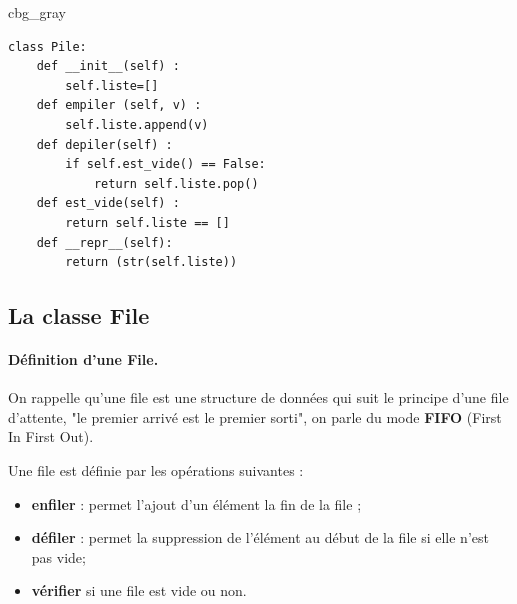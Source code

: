 \documentclass[%
oneside,                 %
final,                   %
10pt]{article}
\newenvironment{_cod_tight}[1]{
   \def\FrameCommand{\colorbox{#1}}
   \FrameRule0.6pt\MakeFramed {\FrameRestore}\vskip3mm}
   {\vskip0mm\endMakeFramed}
\newenvironment{cod}[1]{
\bgroup\rmfamily
\fboxsep=0mm\relax
\begin{_cod_tight}{#1}
\list{}{\parsep=-2mm\parskip=0mm\topsep=0pt\leftmargin=2mm
\rightmargin=2\leftmargin\leftmargin=4pt\relax}
\item\relax}
{\endlist\end{_cod_tight}\egroup}
\begin{document}
\noindent
\begin{cod}{cbg_gray}\begin{verbatim}
class Pile:
    def __init__(self) :
        self.liste=[]
    def empiler (self, v) :
        self.liste.append(v)
    def depiler(self) :
        if self.est_vide() == False:
            return self.liste.pop()
    def est_vide(self) :
        return self.liste == []
    def __repr__(self):
        return (str(self.liste))
\end{verbatim}
\end{cod}
\noindent

\subsection{La classe File}
\paragraph{Définition d'une File.}
On rappelle qu'une file est une structure de données qui suit le principe d'une file d'attente, "le premier arrivé est le premier sorti", on parle du mode \textbf{FIFO} (First In First Out).

Une file est définie par les opérations suivantes :
\begin{itemize}
\item \textbf{enfiler} : permet l'ajout d'un élément la fin de la file ;

\item \textbf{défiler} : permet la suppression de l'élément au début de la file si elle n'est pas vide;

\item \textbf{vérifier} si une file est vide ou non.
\end{itemize}

\noindent
\end{document}
